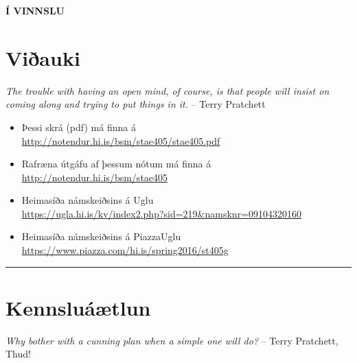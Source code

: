 \documentclass[letterpaper,10pt,icelandic]{sphinxmanual}
\begin{document}
\textbf{Í VINNSLU}


\chapter{Viðauki}
\label{vidauki:viauki}\label{vidauki::doc}
\emph{The trouble with having an open mind, of course, is that people will insist on coming along and trying to put things in it.}
-- Terry Pratchett

\begin{itemize}
	
	\item Þessi skrá (pdf) má finna á \\ \url{http://notendur.hi.is/bsm/stae405/stae405.pdf}
	
	\item Rafræna útgáfu af þessum nótum má finna á \\ \url{http://notendur.hi.is/bsm/stae405}
	
	\item Heimasíða námskeiðsins á Uglu \\ \url{https://ugla.hi.is/kv/index2.php?sid=219&namsknr=09104320160}
	
    \item Heimasíða námskeiðsins á PiazzaUglu \\ \url{https://www.piazza.com/hi.is/spring2016/st405g}
	
\end{itemize}

\newpage

\bigskip\hrule{}\bigskip



\chapter{Kennsluáætlun}
\label{vidauki:kennsluaaetlun}
\emph{Why bother with a cunning plan when a simple one will do?}
-- Terry Pratchett, Thud!
\end{document}

